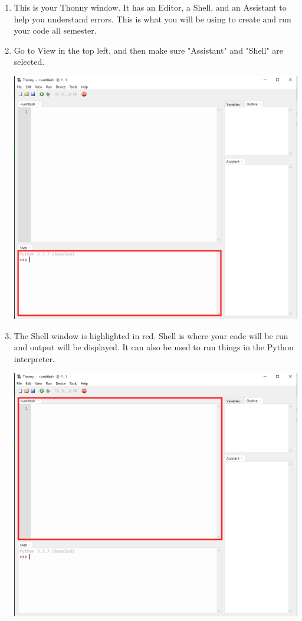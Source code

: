 \documentclass[11pt, letterpaper, onecolumn, oneside, final]{article}
\begin{document}
\begin{enumerate}
\item This is your Thonny window. It has an Editor, a Shell, and an Assistant to help you understand errors. This is what you will be using to create and run your code all semester.
\item Go to View in the top left, and then make sure "Assistant" and "Shell" are selected.
\begin{center}
\includegraphics[scale=.3]{thonny_interpreter}
\end{center}
\item The Shell window is highlighted in red. Shell is where your code will be run and output will be displayed. It can also be used to run things in the Python interpreter.
\begin{center}
\includegraphics[scale=.3]{thonny_editor}

\end{center}
\end{enumerate}
\end{document}

